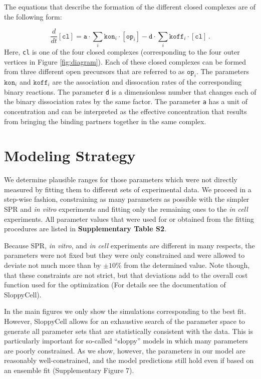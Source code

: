 \documentclass[12pt]{article}
\begin{document}
	The equations that describe the formation of the different closed
	complexes are of the following form:
	
	\begin{equation}
		\frac{d}{dt}[\texttt{cl}]=\texttt{a}\cdot\sum_{i}{\texttt{kon}_{i}}\cdot[\texttt{op}_{i}]-\texttt{d}\cdot\sum_{i}{\texttt{koff}_{i}}\cdot[\texttt{cl}]\,.
	\end{equation}
	Here, \texttt{cl} is one of the four closed complexes (corresponding
	to the four outer vertices in Figure \ref{fig:diagram}). Each of
	these closed complexes can be formed from three different open precursors that are referred to as $\texttt{op}_{i}$. The parameters $\texttt{kon}_{i}$
	and $\texttt{koff}_{i}$ are the association and dissocation rates of the corresponding binary reactions. The parameter \texttt{d} is a dimensionless number that changes each of the binary dissociation
	rates by the same factor. The parameter \texttt{a} has a unit of concentration
	and can be interpreted as the effective concentration that results
	from bringing the binding partners together in the same complex.
	
	\section{Modeling Strategy}
	We determine plausible ranges for those parameters which were not
	directly measured by fitting them to different sets of experimental
	data. We proceed in a step-wise fashion, constraining as many parameters
	as possible with the simpler SPR and \textit{in vitro} experiments
	and fitting only the remaining ones to the \textit{in cell} experiments.
	All parameter values that were used for or obtained from the fitting
	procedures are listed in \textbf{Supplementary Table S2}.
	
	Because SPR, \textit{in vitro}, and \textit{in cell} experiments are
	different in many respects, the parameters were not fixed but they
	were only constrained and were allowed to deviate not much more than
	by $\pm 10\%$ from the determined value. Note though, that these
	constraints are not strict, but that deviations add to the overall
	cost function used for the optimization (For details see the documentation
	of SloppyCell).
	
	In the main figures we only show the simulations corresponding to the best fit. However, SloppyCell allows for an exhaustive search of the parameter space to generate all parameter sets that are statistically consistent with the data. This is particularly important for so-called ``sloppy'' models in which many parameters are poorly constrained. As we show, however, the parameters in our model are reasonably well-constrained, and the model predictions still hold even if based on an ensemble fit (Supplementary Figure 7).
	
\end{document}
